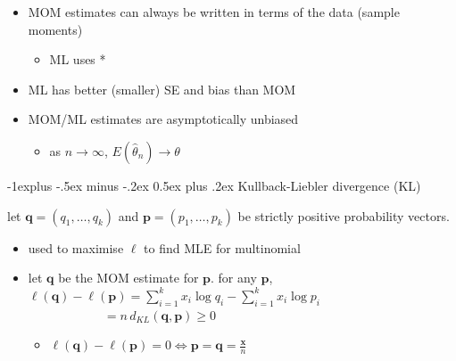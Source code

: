 \documentclass[10pt, landscape]{article}
\makeatletter
\renewcommand{\subsection}{\@startsection{subsection}{2}{0mm}%
  {-1explus -.5ex minus -.2ex}%
  {0.5ex plus .2ex}%
{\normalfont\normalsize\bfseries}}
\newcommand{\seq}[2][n]{#2_1, \dots, #2_{#1}}
\makeatother
\begin{document}
\begin{multicols*}{4}
  \begin{itemize}
    \item MOM estimates can always be written in terms of the data (sample moments)
      \begin{itemize}
        \item ML uses *
      \end{itemize}
    \item ML has better (smaller) SE and bias than MOM
    \item MOM/ML estimates are asymptotically unbiased 
      \begin{itemize}
        \item as $n \to \infty$, $E(\hat\theta_n) \to \theta$
      \end{itemize}
  \end{itemize}

  \subsection{Kullback-Liebler divergence (KL)}

  let $\mathbf{q} = (\seq[k]{q})$ and $\mathbf{p} = (\seq[k]{p})$ be strictly positive probability vectors.


  \begin{itemize}
    \item used to maximise $\ell$ to find MLE for multinomial
    \item let $\mathbf{q}$ be the MOM estimate for $\mathbf{p}$. for any $\mathbf{p}$, $\ell(\mathbf{q}) - \ell(\mathbf{p}) = \sum^k_{i=1}x_i \log q_i - \sum^k_{i=1} x_i \log p_i$ 
      $\qquad\qquad\qquad = n \, d_{KL}(\mathbf{q}, \mathbf{p}) \geq 0$
      \begin{itemize}
        \item $\ell(\mathbf{q}) - \ell(\mathbf{p}) = 0 \iff \mathbf{p} = \mathbf{q} = \frac{\mathbf{x}}{n}$
      \end{itemize}
  \end{itemize}


\end{multicols*}
\end{document}
